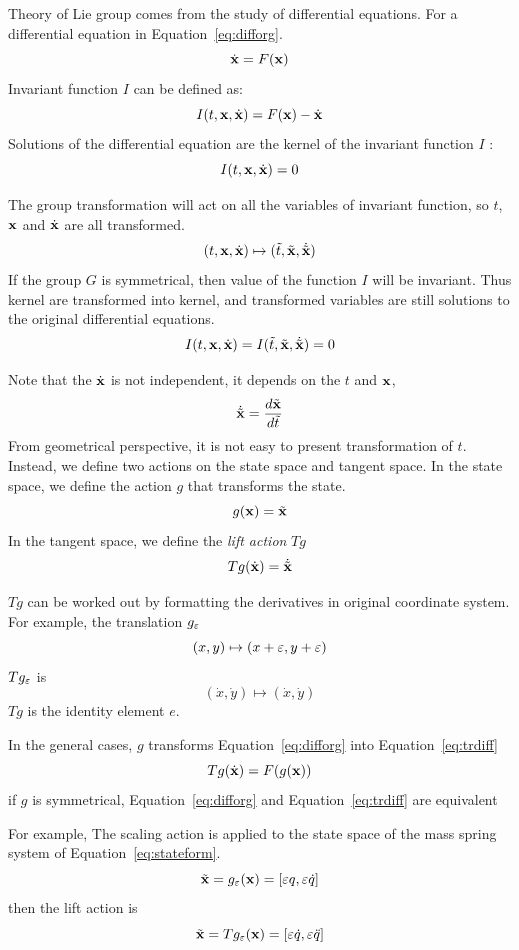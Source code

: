 Theory of Lie group comes from the study of differential equations.
For a differential equation in Equation~\ref{eq:difforg}.
\begin{equation}
\label{eq:difforg}
\dot{\mathbf{x}}=F(\mathbf{x})
\end{equation}
Invariant function $I$ can be defined as:
\[
I(t,\mathbf{x},\dot{\mathbf{x}})=F(\mathbf{x})-\dot{\mathbf{x}}
\]
Solutions of the differential equation are the kernel of the invariant function $I$ :
 \[
 I(t,\mathbf{x},\dot{\mathbf{x}})=0
 \]
 
 
The group transformation will act on all the variables of invariant function, so $t$,$\mathbf{x}$ and $\dot{\mathbf{x}}$ are all transformed.
\[
(t,\mathbf{x},\dot{\mathbf{x}}) \mapsto (\tilde{t},\tilde{\mathbf{x}},\dot{\tilde{\mathbf{x}}})
\]
If the group $G$ is symmetrical, then value of the  function $I$ will be invariant.
Thus kernel are transformed into kernel, and transformed variables are still solutions to the original differential equations. 
\[
I(t,\mathbf{x},\dot{\mathbf{x}})=I(\tilde{t},\tilde{\mathbf{x}},\dot{\tilde{\mathbf{x}}})=0
\]


Note that the $\dot{\mathbf{x}}$ is not independent, it depends on the $t$ and $\mathbf{x}$,
\[
\dot{\tilde{\mathbf{x}}}=\frac{d \tilde{\mathbf{x}} }{d \tilde{t}}
\]
From geometrical perspective, it is not easy to present  transformation of $t$.
Instead, we define two actions on the state space and tangent space.
In the state space, we define the  action $g$ that transforms the state. 
\[
g(\mathbf{x})=\tilde{\mathbf{x}}
\]
In the tangent space, we define the \emph{lift action} $Tg$ 
\[
Tg(\dot{\mathbf{x}})=\dot{\tilde{\mathbf{x}}}
\]

$Tg$ can be worked out by formatting the derivatives in original coordinate system.
For example, the translation $g_{\varepsilon}$ 
\[
(x,y)\mapsto (x+\varepsilon,y+\varepsilon)
\]
$Tg_{\varepsilon}$ is
\[
(\dot{x},\dot{y}) \mapsto (\dot{x},\dot{y})
\]
$Tg$ is the identity element $e$.


In the general cases, $g$ transforms Equation~\ref{eq:difforg} into Equation~\ref{eq:trdiff}
\begin{equation}
\label{eq:trdiff}
Tg(\dot{\mathbf{x}})=F(g(\mathbf{x}))
\end{equation}
if $g$ is symmetrical, Equation~\ref{eq:difforg} and Equation~\ref{eq:trdiff} are equivalent







 	
For example, 
The scaling action is applied to the state space of the mass spring system of Equation~\ref{eq:stateform}. 
\[
\tilde{\mathbf{x}}=g_{\varepsilon}(\mathbf{x})=[\varepsilon q, \varepsilon \dot{q} ]
\]
then the lift action is
\[
\tilde{\mathbf{x}}=Tg_{\varepsilon}(\mathbf{x})=[\varepsilon \dot{q}, \varepsilon \ddot{q}]
\]



